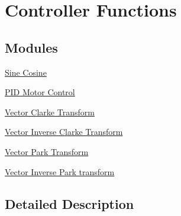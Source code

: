 \hypertarget{group__group_controller}{\section{Controller Functions}
\label{group__group_controller}
}
\subsection*{Modules}
\begin{DoxyCompactItemize}
\item 
\hyperlink{group___sin_cos}{Sine Cosine}
\item 
\hyperlink{group___p_i_d}{P\-I\-D Motor Control}
\item 
\hyperlink{group__clarke}{Vector Clarke Transform}
\item 
\hyperlink{group__inv__clarke}{Vector Inverse Clarke Transform}
\item 
\hyperlink{group__park}{Vector Park Transform}
\item 
\hyperlink{group__inv__park}{Vector Inverse Park transform}
\end{DoxyCompactItemize}


\subsection{Detailed Description}

